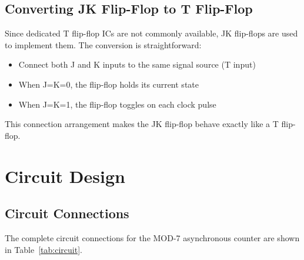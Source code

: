 \documentclass{article}
\begin{document}
\subsection{Converting JK Flip-Flop to T Flip-Flop}
\begin{tcolorbox}[colback=boxbg,colframe=titlebg,title=JK to T Flip-Flop Conversion,breakable]
Since dedicated T flip-flop ICs are not commonly available, JK flip-flops are used to implement them. The conversion is straightforward:

\begin{itemize}
    \item Connect both J and K inputs to the same signal source (T input)
    \item When J=K=0, the flip-flop holds its current state
    \item When J=K=1, the flip-flop toggles on each clock pulse
\end{itemize}

This connection arrangement makes the JK flip-flop behave exactly like a T flip-flop.
\end{tcolorbox}

\section{Circuit Design}
\subsection{Circuit Connections}
\begin{tcolorbox}[colback=boxbg,colframe=titlebg,title=Circuit Connections,breakable]
The complete circuit connections for the MOD-7 asynchronous counter are shown in Table~\ref{tab:circuit}.
\end{tcolorbox}
\end{document}
